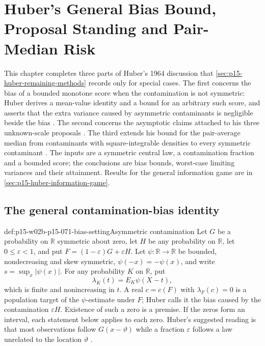 \chapter{Huber's General Bias Bound, Proposal Standing and Pair-Median Risk}
\label{sec:p15-w02b-p15-071-huber-completions}

This chapter completes three parts of Huber's 1964 discussion that
\cref{sec:p15-huber-remaining-methods} records only for special cases.
The first concerns the bias of a bounded monotone score when the
contamination is not symmetric: Huber derives a mean-value identity
and a bound for an arbitrary such score, and asserts that the extra
variance caused by asymmetric contaminants is negligible beside the bias
\cite[Sec.~7, pp.~82--83]{Huber1964RobustLocation}.
The second concerns the asymptotic claims attached to his three
unknown-scale proposals \cite[Sec.~11, pp.~96--97]{Huber1964RobustLocation}.
The third extends his bound for the pair-average median from contaminants
with square-integrable densities to every symmetric contaminant
\cite[Sec.~12, pp.~100--101]{Huber1964RobustLocation}.
The inputs are a symmetric central law, a contamination fraction and
a bounded score; the conclusions are bias bounds, worst-case limiting
variances and their attainment. Results for the general information game
are in \cref{sec:p15-huber-information-game}.

\section{The general contamination-bias identity}
\label{sec:p15-w02b-p15-071-bias}

\begin{hbdefinition}{def:p15-w02b-p15-071-bias-setting}{Asymmetric contamination}
Let \(G\) be a probability on \(\mathbb R\) symmetric about zero,
let \(H\) be any probability on \(\mathbb R\), let
\(0\leq\varepsilon<1\), and put \(F=(1-\varepsilon)G+\varepsilon H\).
Let \(\psi:\mathbb R\to\mathbb R\) be bounded, nondecreasing and
skew symmetric, \(\psi(-x)=-\psi(x)\), and write
\(s=\sup_x|\psi(x)|\).
For any probability \(K\) on \(\mathbb R\), put
\[
 \lambda_K(t)=E_K\psi(X-t),
\]
which is finite and nonincreasing in \(t\).
A real \(c=c(F)\) with \(\lambda_F(c)=0\) is a population target of
the \(\psi\)-estimate under \(F\); Huber calls it the bias caused by
the contamination \(\varepsilon H\). Existence of such a zero is a
premise. If the zeros form an interval, each statement below applies
to each zero.
Huber's suggested reading is that most observations follow
\(G(x-\vartheta)\) while a fraction \(\varepsilon\) follows a law
unrelated to the location \(\vartheta\)
\cite[p.~82]{Huber1964RobustLocation}.
\end{hbdefinition}

